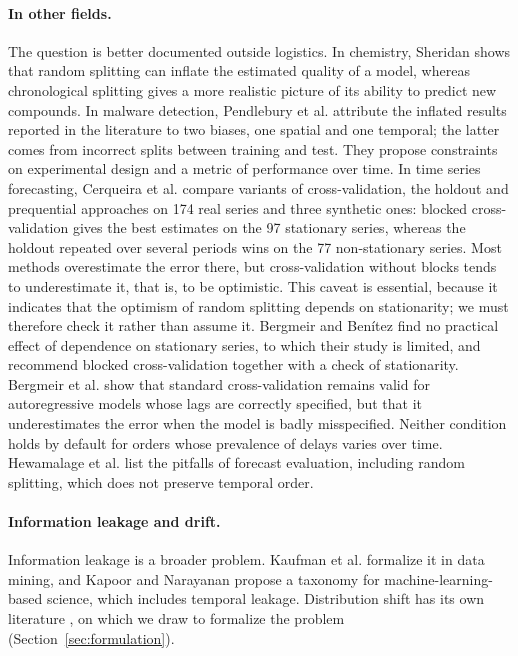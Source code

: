 \documentclass[11pt,a4paper]{article}
\theoremstyle{definition}
\begin{document}
\paragraph{In other fields.} The question is better documented outside logistics. In chemistry, Sheridan \cite{sheridan2013time} shows that random splitting can inflate the estimated quality of a model, whereas chronological splitting gives a more realistic picture of its ability to predict new compounds. In malware detection, Pendlebury et al. \cite{pendlebury2019tesseract} attribute the inflated results reported in the literature to two biases, one spatial and one temporal; the latter comes from incorrect splits between training and test. They propose constraints on experimental design and a metric of performance over time. In time series forecasting, Cerqueira et al. \cite{cerqueira2020evaluating} compare variants of cross-validation, the holdout and prequential approaches on 174 real series and three synthetic ones: blocked cross-validation gives the best estimates on the 97 stationary series, whereas the holdout repeated over several periods wins on the 77 non-stationary series. Most methods overestimate the error there, but cross-validation without blocks tends to underestimate it, that is, to be optimistic. This caveat is essential, because it indicates that the optimism of random splitting depends on stationarity; we must therefore check it rather than assume it. Bergmeir and Benítez \cite{bergmeir2012use} find no practical effect of dependence on stationary series, to which their study is limited, and recommend blocked cross-validation together with a check of stationarity. Bergmeir et al. \cite{bergmeir2018note} show that standard cross-validation remains valid for autoregressive models whose lags are correctly specified, but that it underestimates the error when the model is badly misspecified. Neither condition holds by default for orders whose prevalence of delays varies over time. Hewamalage et al. \cite{hewamalage2023forecast} list the pitfalls of forecast evaluation, including random splitting, which does not preserve temporal order.

\paragraph{Information leakage and drift.} Information leakage is a broader problem. Kaufman et al. \cite{kaufman2012leakage} formalize it in data mining, and Kapoor and Narayanan \cite{kapoor2023leakage} propose a taxonomy for machine-learning-based science, which includes temporal leakage. Distribution shift has its own literature \cite{gama2014survey,morenotorres2012unifying}, on which we draw to formalize the problem (Section~\ref{sec:formulation}).
\end{document}
